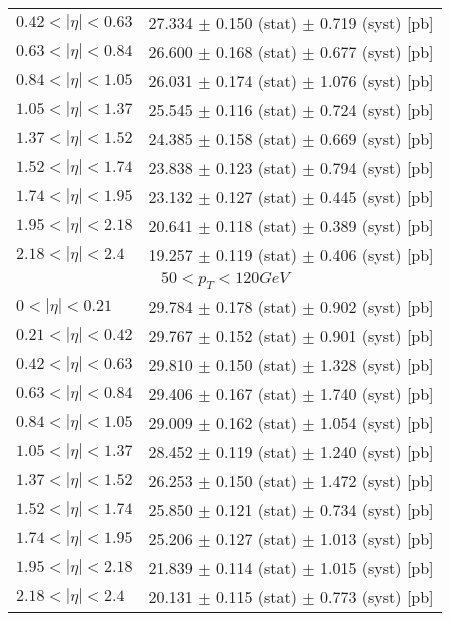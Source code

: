 \begin{tabular}{lc}
$0.42 < |\eta| <0.63$          & 27.334 $\pm$ 0.150 (stat) $\pm$ 0.719 (syst) [pb]  \\
$0.63 < |\eta| <0.84$          & 26.600 $\pm$ 0.168 (stat) $\pm$ 0.677 (syst) [pb]  \\
$0.84 < |\eta| <1.05$          & 26.031 $\pm$ 0.174 (stat) $\pm$ 1.076 (syst) [pb]  \\
$1.05 < |\eta| <1.37$          & 25.545 $\pm$ 0.116 (stat) $\pm$ 0.724 (syst) [pb]  \\
$1.37 < |\eta| <1.52$          & 24.385 $\pm$ 0.158 (stat) $\pm$ 0.669 (syst) [pb]  \\
$1.52 < |\eta| <1.74$          & 23.838 $\pm$ 0.123 (stat) $\pm$ 0.794 (syst) [pb]  \\
$1.74 < |\eta| <1.95$          & 23.132 $\pm$ 0.127 (stat) $\pm$ 0.445 (syst) [pb]  \\
$1.95 < |\eta| <2.18$          & 20.641 $\pm$ 0.118 (stat) $\pm$ 0.389 (syst) [pb]  \\
$2.18 < |\eta| <2.4$           & 19.257 $\pm$ 0.119 (stat) $\pm$ 0.406 (syst) [pb]  \\
\hline
\multicolumn{2}{c}{$50 < p_{T} < 120 GeV$} \\
\hline
$0 < |\eta| <0.21$             & 29.784 $\pm$ 0.178 (stat) $\pm$ 0.902 (syst) [pb]  \\
$0.21 < |\eta| <0.42$          & 29.767 $\pm$ 0.152 (stat) $\pm$ 0.901 (syst) [pb]  \\
$0.42 < |\eta| <0.63$          & 29.810 $\pm$ 0.150 (stat) $\pm$ 1.328 (syst) [pb]  \\
$0.63 < |\eta| <0.84$          & 29.406 $\pm$ 0.167 (stat) $\pm$ 1.740 (syst) [pb]  \\
$0.84 < |\eta| <1.05$          & 29.009 $\pm$ 0.162 (stat) $\pm$ 1.054 (syst) [pb]  \\
$1.05 < |\eta| <1.37$          & 28.452 $\pm$ 0.119 (stat) $\pm$ 1.240 (syst) [pb]  \\
$1.37 < |\eta| <1.52$          & 26.253 $\pm$ 0.150 (stat) $\pm$ 1.472 (syst) [pb]  \\
$1.52 < |\eta| <1.74$          & 25.850 $\pm$ 0.121 (stat) $\pm$ 0.734 (syst) [pb]  \\
$1.74 < |\eta| <1.95$          & 25.206 $\pm$ 0.127 (stat) $\pm$ 1.013 (syst) [pb]  \\
$1.95 < |\eta| <2.18$          & 21.839 $\pm$ 0.114 (stat) $\pm$ 1.015 (syst) [pb]  \\
$2.18 < |\eta| <2.4$           & 20.131 $\pm$ 0.115 (stat) $\pm$ 0.773 (syst) [pb]  \\
\hline
\hline
\end{tabular}
